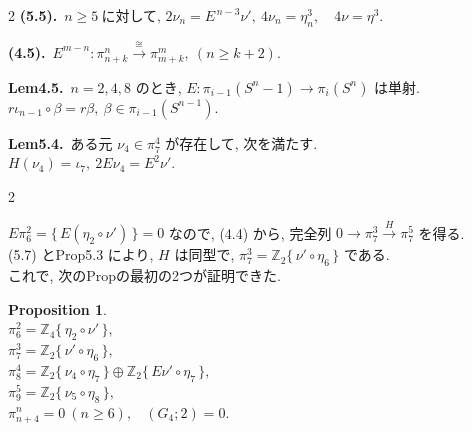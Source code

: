 \documentclass[10pt, leqno]{ltjsarticle}
\newcommand{\gen}[1]{\{\,#1\,\}}       %
\newcommand{\pis}[2]{\pi_{#1}(#2)}       %
\newcommand{\pit}[2]{\pi_{#1}^{#2}}
\numberwithin{equation}{section}
\theoremstyle{plain}
\newtheorem{proposition}[theorem]{Proposition}
\theoremstyle{definition}
\theoremstyle{remark}
\begin{document}
\begin{paracol}{2}
\noindent
\textbf{(5.5).}\
\(n\ge5\ \text{に対して, } 2\nu_n=E^{\,n-3}\nu',\
4\nu_{n}=\eta_n^{3},\quad 4\nu=\eta^{3}.\)

\noindent
\textbf{(4.5).}\
\(E^{m-n}:\pit{n+k}{n}\xrightarrow{\cong}\pit{m+k}{m},\
(n\ge k+2). \)

\noindent
\textbf{Lem4.5.}\
\(n=2,4,8\) のとき, 
\(E:\pis{i-1}{S^n-1}\to\pis{i}{S^n}\) は単射.\\ 
\(r\iota_{n-1}\circ\beta = r\beta,\ \beta\in\pis{i-1}{S^{n-1}}\).

\noindent
\textbf{Lem5.4.}\
ある元 \(\nu_{4}\in \pi^{4}_{7}\) が存在して, 次を満たす. \\
\(H(\nu_{4})=\iota_7,\ 2E \nu_{4}=E^{2}\nu' .\)


\end{paracol}

\begin{paracol}{2}


\(E\pi_6^2=\gen{E(\eta_2\circ\nu')}=0\) なので, 
(4.4) から, 完全列 
\(0\to\pi_7^3\xrightarrow H \pi_7^5\) を得る. \\
(5.7) とProp5.3 により, \(H\) は同型で, 
\(\pi_7^3=\mathbb Z_2\gen{\nu'\circ\eta_6}\) である. \\
これで, 次のPropの最初の2つが証明できた. 

\begin{proposition}\label{prop:5.8}
\ \\
\(\pi^{2}_{6}=\mathbb Z_4\gen{\eta_{2}\circ\nu'},\) \\
\(\pi^{3}_{7}=\mathbb Z_2\gen{\nu'\circ\eta_6},\) \\
\(\pi^{4}_{8}=\mathbb Z_2\gen{\nu_{4}\circ\eta_7}\oplus \mathbb Z_2\gen{E\nu'\circ\eta_7},\) \\
\(\pi^{5}_{9}=\mathbb Z_2\gen{\nu_{5}\circ\eta_8},\) \\
\(\pi^{n}_{n+4}=0\ (n\ge6),\) \
\((G_{4};2)=0.\)
\end{proposition}


\end{paracol}
\end{document}

